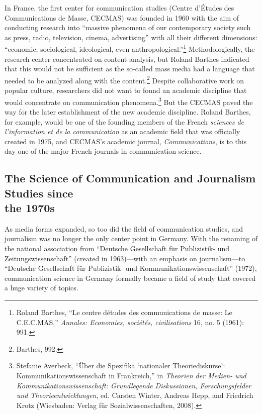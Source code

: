 \documentclass{tufte-handout}
\begin{document}
In France, the first center for communication studies (Centre d'Études
des Communications de Masse, CECMAS) was founded in 1960 with the aim of
conducting research into ``massive phenomena of our contemporary society
such as press, radio, television, cinema, advertising'' with all their
different dimensions: ``economic, sociological, ideological, even
anthropological.''\footnote{Roland Barthes, ``Le centre
  d\textquotesingle études des communications de masse: Le C.E.C.MAS,''
  \emph{Annales: Economies, sociétés, civilisations} 16, no. 5 (1961):
  991.} Methodologically, the research center concentrated on content
analysis, but Roland Barthes indicated that this would not be sufficient
as the so-called mass media had a language that needed to be analyzed
along with the content.\footnote{Barthes, 992.} Despite collaborative
work on popular culture, researchers did not want to found an academic
discipline that would concentrate on communication phenomena.\footnote{Stefanie
  Averbeck, ``Über die Spezifika `nationaler Theoriediskurse':
  Kommunikationswissenschaft in Frankreich,'' in \emph{Theorien der
  Medien- und Kommunikationswissenschaft: Grundlegende Diskussionen,
  Forschungsfelder und Theorieentwicklungen}, ed. Carsten Winter,
  Andreas Hepp, and Friedrich Krotz (Wiesbaden: Verlag für
  Sozialwissenschaften, 2008).} But the CECMAS paved the way for the
later establishment of the new academic discipline. Roland Barthes, for
example, would be one of the founding members of the French
\emph{sciences de l'information et de la communication} as an academic
field that was officially created in 1975, and CECMAS's academic
journal, \emph{Communications}, is to this day one of the major French
journals in communication science.

\hypertarget{the-science-of-communication-and-journalism-studies-since-the-1970s}{%
\subsection{The Science of Communication and
Journalism Studies since\\\noindent the
1970s}\label{the-science-of-communication-and-journalism-studies-since-the-1970s}}

As media forms expanded, so too did the field of communication studies,
and journalism was no longer the only center point in Germany. With the
renaming of the national association from ``Deutsche Gesellschaft für
Publizistik- und Zeitungswissenschaft'' (created in 1963)---with an
emphasis on journalism---to ``Deutsche Gesellschaft für Publizistik- und
Kommunikationswissenschaft'' (1972), communication science in Germany
formally became a field of study that covered a huge variety of topics.
\end{document}
